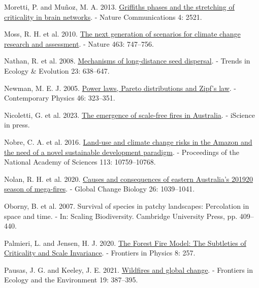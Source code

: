 \documentclass[
]{article}
\newlength{\cslhangindent}
\newenvironment{CSLReferences}[2] %
 {\begin{list}{}{%
  \setlength{\itemindent}{0pt}
  \setlength{\leftmargin}{0pt}
  \setlength{\parsep}{0pt}
  \ifodd #1
   \setlength{\leftmargin}{\cslhangindent}
   \setlength{\itemindent}{-1\cslhangindent}
  \fi
  \setlength{\itemsep}{#2\baselineskip}}}
 {\end{list}}
\begin{document}
\begin{CSLReferences}{1}{1}
Moretti, P. and Muñoz, M. A. 2013.
\href{https://doi.org/10.1038/ncomms3521}{Griffiths phases and the
stretching of criticality in brain networks}. - Nature Communications 4:
2521.

Moss, R. H. et al. 2010. \href{https://doi.org/10.1038/nature08823}{The
next generation of scenarios for climate change research and
assessment}. - Nature 463: 747--756.

Nathan, R. et al. 2008.
\href{https://doi.org/10.1016/j.tree.2008.08.003}{Mechanisms of
long-distance seed dispersal}. - Trends in Ecology \& Evolution 23:
638--647.

Newman, M. E. J. 2005.
\href{https://doi.org/10.1080/00107510500052444}{Power laws, {Pareto}
distributions and {Zipf}'s law}. - Contemporary Physics 46: 323--351.

Nicoletti, G. et al. 2023.
\href{https://doi.org/10.1016/j.isci.2023.106181}{The emergence of
scale-free fires in {Australia}}. - iScience in press.

Nobre, C. A. et al. 2016.
\href{https://doi.org/10.1073/pnas.1605516113}{Land-use and climate
change risks in the {Amazon} and the need of a novel sustainable
development paradigm}. - Proceedings of the National Academy of Sciences
113: 10759--10768.

Nolan, R. H. et al. 2020.
\href{https://doi.org/10.1111/gcb.14987}{Causes and consequences of
eastern {Australia}'s 2019{\textendash}20 season of mega-fires}. -
Global Change Biology 26: 1039--1041.

Oborny, B. et al. 2007. Survival of species in patchy landscapes:
Percolation in space and time. - In: Scaling {Biodiversity}. {Cambridge
University Press}, pp. 409--440.

Palmieri, L. and Jensen, H. J. 2020.
\href{https://doi.org/10.3389/fphy.2020.00257}{The {Forest Fire Model}:
{The Subtleties} of {Criticality} and {Scale Invariance}}. - Frontiers
in Physics 8: 257.

Pausas, J. G. and Keeley, J. E. 2021.
\href{https://doi.org/10.1002/fee.2359}{Wildfires and global change}. -
Frontiers in Ecology and the Environment 19: 387--395.


\end{CSLReferences}
\end{document}
